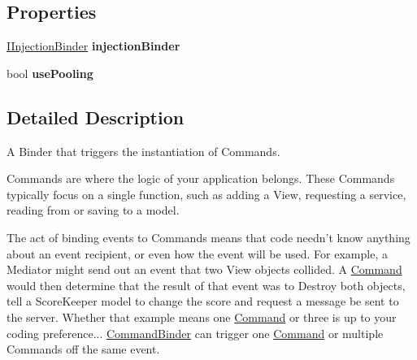 \subsection*{Properties}
\begin{DoxyCompactItemize}
\item 
\hypertarget{classstrange_1_1extensions_1_1command_1_1impl_1_1_command_binder_a011d8c52fdd8fdfffbc3d61089d3ff19}{\hyperlink{interfacestrange_1_1extensions_1_1injector_1_1api_1_1_i_injection_binder}{I\-Injection\-Binder} {\bfseries injection\-Binder}}\label{classstrange_1_1extensions_1_1command_1_1impl_1_1_command_binder_a011d8c52fdd8fdfffbc3d61089d3ff19}

\item 
\hypertarget{classstrange_1_1extensions_1_1command_1_1impl_1_1_command_binder_a1093c0bcae55cef2bb0f211714d070c5}{bool {\bfseries use\-Pooling}}\label{classstrange_1_1extensions_1_1command_1_1impl_1_1_command_binder_a1093c0bcae55cef2bb0f211714d070c5}

\end{DoxyCompactItemize}


\subsection{Detailed Description}
A Binder that triggers the instantiation of Commands. 

Commands are where the logic of your application belongs. These Commands typically focus on a single function, such as adding a View, requesting a service, reading from or saving to a model.

The act of binding events to Commands means that code needn't know anything about an event recipient, or even how the event will be used. For example, a Mediator might send out an event that two View objects collided. A \hyperlink{classstrange_1_1extensions_1_1command_1_1impl_1_1_command}{Command} would then determine that the result of that event was to Destroy both objects, tell a Score\-Keeper model to change the score and request a message be sent to the server. Whether that example means one \hyperlink{classstrange_1_1extensions_1_1command_1_1impl_1_1_command}{Command} or three is up to your coding preference... \hyperlink{classstrange_1_1extensions_1_1command_1_1impl_1_1_command_binder}{Command\-Binder} can trigger one \hyperlink{classstrange_1_1extensions_1_1command_1_1impl_1_1_command}{Command} or multiple Commands off the same event.

